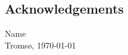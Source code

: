 \documentclass[twoside, 12pt]{article} %
\begin{document}
\thispagestyle{plain}
\setcounter{page}{3}
\vspace*{1cm}
\begin{centering}
	\section*{Acknowledgements}
\lipsum[2-4]

\end{centering}

\vspace*{3cm}

\begin{flushright}
	Name\\
	Tromsø, \today
\end{flushright}
\vspace*{\fill}
\newpage


\thispagestyle{plain}



\thispagestyle{plain}
\tableofcontents
\thispagestyle{plain}
\newpage
\thispagestyle{plain}
\listoffigures
\newpage
\thispagestyle{plain}
\listoftables

\setcounter{page}{8} %






\begin{multicols}{2}
	\renewcommand*{\bibfont}{\footnotesize}
	\printbibliography[heading=bibintoc] %
\end{multicols}



\newpage
\thispagestyle{empty}

\end{document}
